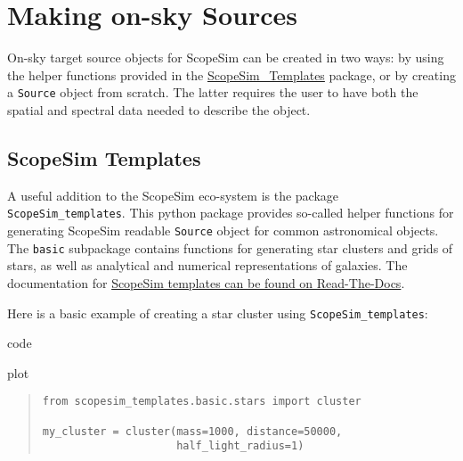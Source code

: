 

\section{Making on-sky Sources%
  \label{making-on-sky-sources}%
}

On-sky target source objects for ScopeSim can be created in two ways:
by using the helper functions provided in the \href{https://scopesim-templates.readthedocs.io/en/latest/}{ScopeSim\_Templates} package, or by creating a \texttt{Source} object from scratch.
The latter requires the user to have both the spatial and spectral data needed to describe the object.


\subsection{ScopeSim Templates%
  \label{scopesim-templates}%
}

A useful addition to the ScopeSim eco-system is the package \texttt{ScopeSim\_templates}.
This python package provides so-called helper functions for generating ScopeSim readable \texttt{Source} object for common astronomical objects.
The \texttt{basic} subpackage contains functions for generating star clusters and grids of stars, as well as analytical and numerical representations of galaxies.
The documentation for \href{https://scopesim-templates.readthedocs.io/en/latest/}{ScopeSim templates can be found on Read-The-Docs}.

Here is a basic example of creating a star cluster using \texttt{ScopeSim\_templates}:

\label{code-scopesim-templates-example}
\begin{DUclass}{code}
\begin{DUclass}{plot}
\begin{quote}
\begin{alltt}
\begin{lstlisting}[frame=single]
from scopesim_templates.basic.stars import cluster

my_cluster = cluster(mass=1000, distance=50000,
                     half_light_radius=1)
\end{lstlisting}
\end{alltt}
\end{quote}
\end{DUclass}
\end{DUclass}


